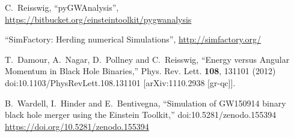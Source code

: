 \begin{thebibliography}{9}
C.~Reisswig,
``pyGWAnalysis'',
\url{https://bitbucket.org/einsteintoolkit/pygwanalysis}

``SimFactory: Herding numerical Simulations'',
\url{http://simfactory.org/}

T.~Damour, A.~Nagar, D.~Pollney and C.~Reisswig,
``Energy versus Angular Momentum in Black Hole Binaries,''
Phys. Rev. Lett. \textbf{108}, 131101 (2012)
doi:10.1103/PhysRevLett.108.131101
[arXiv:1110.2938 [gr-qc]].

B.~Wardell, I.~Hinder and E.~Bentivegna,
``Simulation of GW150914 binary black hole merger using the Einstein Toolkit,''
doi:10.5281/zenodo.155394
\url{https://doi.org/10.5281/zenodo.155394}


\end{thebibliography}



